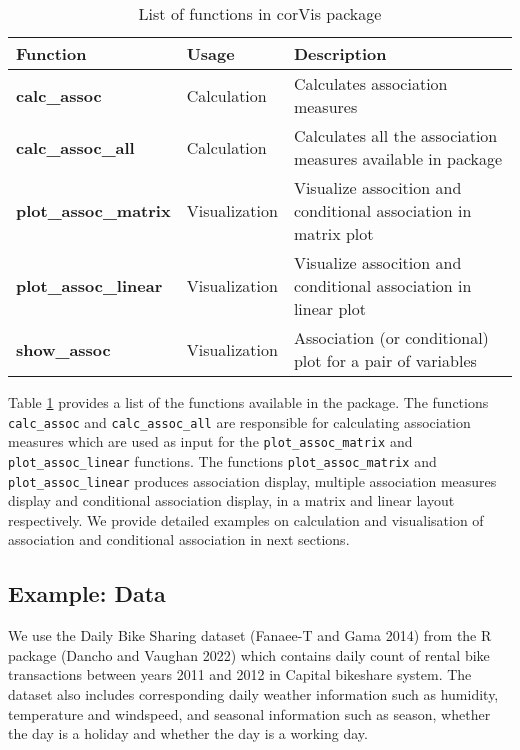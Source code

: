 \begin{table}

\caption{\label{tab:function-corVis}List of functions in corVis package}
\centering
\begin{tabular}[t]{>{}lll}
\toprule
Function & Usage & Description\\
\midrule
\textbf{calc\_assoc} & Calculation & Calculates association measures\\
\textbf{calc\_assoc\_all} & Calculation & Calculates all the association measures available in package\\
\textbf{plot\_assoc\_matrix} & Visualization & Visualize assocition and conditional association in matrix plot\\
\textbf{plot\_assoc\_linear} & Visualization & Visualize assocition and conditional association in linear plot\\
\textbf{show\_assoc} & Visualization & Association (or conditional) plot for a pair of variables\\
\bottomrule
\end{tabular}
\end{table}

Table \ref{tab:function-corVis} provides a list of the functions available in the package. The functions \texttt{calc\_assoc} and \texttt{calc\_assoc\_all} are responsible for calculating association measures which are used as input for the \texttt{plot\_assoc\_matrix} and \texttt{plot\_assoc\_linear} functions. The functions \texttt{plot\_assoc\_matrix} and \texttt{plot\_assoc\_linear} produces association display, multiple association measures display and conditional association display, in a matrix and linear layout respectively. We provide detailed examples on calculation and visualisation of association and conditional association in next sections.

\hypertarget{example-data}{%
\subsection{Example: Data}\label{example-data}}

We use the Daily Bike Sharing dataset (Fanaee-T and Gama 2014) from the R package  (Dancho and Vaughan 2022) which contains daily count of rental bike transactions between years 2011 and 2012 in Capital bikeshare system. The dataset also includes corresponding daily weather information such as humidity, temperature and windspeed, and seasonal information such as season, whether the day is a holiday and whether the day is a working day.

